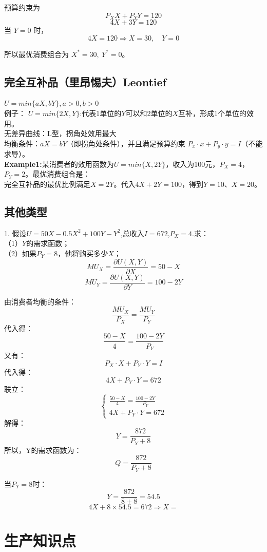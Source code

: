 \documentclass[cn,hazy,blue,14pt,screen]{elegantnote}
\begin{document}
预算约束为
$$
P_X X + P_Y Y = 120
$$
$$
4X + 3Y = 120
$$
当 $Y=0$ 时，
$$
4X = 120 \Rightarrow X = 30,\quad Y = 0
$$

所以最优消费组合为 $X^*=30,\ Y^*=0$。


\subsection{完全互补品（里昂惕夫）Leontief}
$U = min\{aX, bY\}, a>0, b>0$ \\
例子： $U = min\{2X,Y\}$:代表1单位的$Y$可以和2单位的$X$互补，形成1个单位的效用。\\
无差异曲线：L型，拐角处效用最大\\
均衡条件：$aX = bY$（即拐角处条件），并且满足预算约束 $P_x \cdot x + P_y \cdot y = I$（不能求导）。\\

\textbf{Example1:}某消费者的效用函数为$U=min\{X,2Y\}$，收入为100元，$P_X=4$，$P_Y=2$。最优消费组合是：\\
完全互补品的最优比例满足$X=2Y$。代入$4X+2Y=100$，得到$Y=10$、$X=20$。

\subsection{其他类型}
1. 假设$U = 50X -0.5X^{2} +100Y - Y^{2}$,总收入$I=672$,$P_X=4$.求：\\
（1）$Y$的需求函数；\\
（2）如果$P_Y=8$，他将购买多少$X$；\\

$$MU_X = \frac{\partial U(X,Y)}{\partial X} = 50 - X$$
$$MU_Y = \frac{\partial U(X,Y)}{\partial Y} = 100 - 2Y$$

由消费者均衡的条件：
$$\frac{MU_X}{P_X} = \frac{MU_Y}{P_Y}$$
代入得：
$$\frac{50 - X}{4} = \frac{100 - 2Y}{P_Y}$$
又有：
$$P_X \cdot X + P_Y \cdot Y = I$$
代入得：
$$4X + P_Y \cdot Y = 672$$
联立：
$$\begin{cases}
    \frac{50 - X}{4} = \frac{100 - 2Y}{P_Y} \\
    4X + P_Y \cdot Y = 672
\end{cases}$$
解得：
$$Y = \frac{872}{P_Y + 8}$$
所以，Y的需求函数为：
$$ Q = \frac{872}{P_Y + 8}$$

当$P_Y=8时$：
$$Y = \frac{872}{8 + 8} = 54.5$$
$$4X + 8 \times 54.5 = 672 \Rightarrow X = $$

\section{生产知识点}
\end{document}
